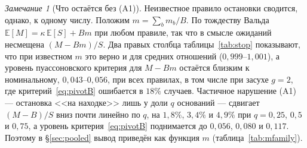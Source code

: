 \documentclass[11pt,a4paper]{article}
\theoremstyle{plain}
\theoremstyle{remark}
\newtheorem{remark}{Замечание}
\begin{document}
\begin{remark}[Что остаётся без (A1)]
Неизвестное правило остановки сводится, однако, к одному числу. Положим
$m=\sum_bm_b/B$. По тождеству Вальда $\mathbb E[M]=\kappa\,\mathbb E[S]+Bm$ при
любом правиле, так что в смысле ожиданий несмещена $(M-Bm)/S$. Два правых
столбца таблицы~\ref{tab:stop} показывают, что при известном $m$ это верно и для
средних отношений ($0{,}999$--$1{,}001$), а уровень пуассоновского критерия для
$M-Bm$ остаётся близким к номинальному, $0{,}043$--$0{,}056$, при всех правилах, в том числе при засухе
$g=2$, где критерий~\eqref{eq:pivotB} ошибается в $18\%$ случаев. Частичное
нарушение (A1) --- остановка <<на находке>> лишь у доли $q$ оснований --- сдвигает
$(M-B)/S$ вниз почти линейно по $q$, на $1{,}8\%$, $3{,}4\%$ и $4{,}9\%$ при
$q=0{,}25$, $0{,}5$ и $0{,}75$, а уровень критерия~\eqref{eq:pivotB} поднимается до
$0{,}056$, $0{,}080$ и $0{,}117$. Поэтому в \S\ref{sec:pooled} вывод приведён как
функция $m$ (таблица~\ref{tab:mfamily}).
\end{remark}
\end{document}
